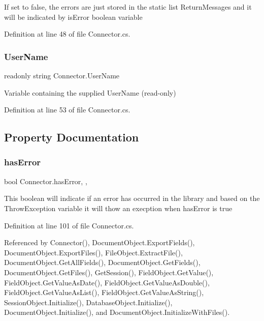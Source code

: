 If set to false, the errors are just stored in the static list Return\+Messages and it will be indicated by is\+Error boolean variable

Definition at line 48 of file Connector.\+cs.

\mbox{\label{class_connector_a41d247f09774f0ed206ce1a4a2463fed}} 
\subsubsection{\texorpdfstring{User\+Name}{UserName}}
{\footnotesize\ttfamily readonly string Connector.\+User\+Name}



Variable containing the supplied User\+Name (read-\/only) 



Definition at line 53 of file Connector.\+cs.



\subsection{Property Documentation}
\mbox{\label{class_connector_a079bae21a5417efa53bfe8954c0f533f}} 
\subsubsection{\texorpdfstring{has\+Error}{hasError}}
{\footnotesize\ttfamily bool Connector.\+has\+Error\hspace{0.3cm}{\ttfamily [static]}, {\ttfamily [get]}, {\ttfamily [set]}}



This boolean will indicate if an error has occurred in the library and based on the Throw\+Exception variable it will thow an execption when has\+Error is true 



Definition at line 101 of file Connector.\+cs.



Referenced by Connector(), Document\+Object.\+Export\+Fields(), Document\+Object.\+Export\+Files(), File\+Object.\+Extract\+File(), Document\+Object.\+Get\+All\+Fields(), Document\+Object.\+Get\+Fields(), Document\+Object.\+Get\+Files(), Get\+Session(), Field\+Object.\+Get\+Value(), Field\+Object.\+Get\+Value\+As\+Date(), Field\+Object.\+Get\+Value\+As\+Double(), Field\+Object.\+Get\+Value\+As\+List(), Field\+Object.\+Get\+Value\+As\+String(), Session\+Object.\+Initialize(), Database\+Object.\+Initialize(), Document\+Object.\+Initialize(), and Document\+Object.\+Initialize\+With\+Files().


